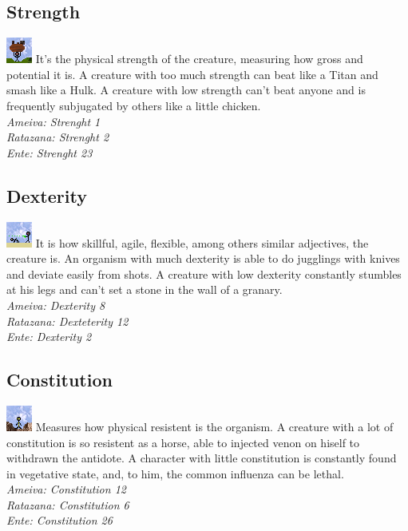 \documentclass[ letterpaper,12pt]{article}
\begin{document}
\subsection{Strength}
\includegraphics{../data/skills/Img/forca.png}
It's the physical strength of the creature, measuring how gross and potential
it is. A creature with too much strength can beat like a Titan and smash like a
Hulk. A creature with low strength can't beat anyone and is frequently
subjugated by others like a little chicken.\\ 
{\it Ameiva: Strenght 1\\
Ratazana: Strenght 2\\
Ente: Strenght 23\\}

\subsection{Dexterity}
\includegraphics{../data/skills/Img/destreza.png}
It is how skillful, agile, flexible, among others similar adjectives, the
creature is. An organism with much dexterity is able to do jugglings with
knives and deviate easily from shots. A creature with low dexterity constantly
stumbles at his legs and can't set a stone in the wall of a granary.\\
{\it Ameiva: Dexterity 8\\
Ratazana: Dexteterity 12\\
Ente: Dexterity 2}

\subsection{Constitution}
\includegraphics{../data/skills/Img/constituicao.png}
Measures how physical resistent is the organism. A creature with a lot of
constitution is so resistent as a horse, able to injected venon on hiself to
withdrawn the antidote. A character with little constitution is constantly
found in vegetative state, and, to him, the common influenza can be lethal.\\
{\it Ameiva: Constitution 12\\
Ratazana: Constitution 6\\
Ente: Constitution 26}
\end{document}
